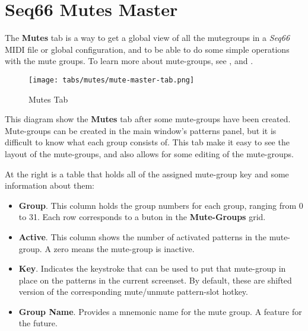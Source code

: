 %
%
%

\section{Seq66 Mutes Master}
\label{sec:mutes_master}

   The \textbf{Mutes} tab is a way to get a global view of all the mutegroups in
   a \textsl{Seq66} MIDI file or global configuration, and to be able to do
   some simple operations with the mute groups.
   To learn more about mute-groups, see
   , and
   .

\begin{figure}[H]
   \centering 
   \texttt{[image: tabs/mutes/mute-master-tab.png]}
   \caption{Mutes Tab}
   \label{fig:mutes_master_tab}
\end{figure}

   This diagram show the \textbf{Mutes} tab after some mute-groups have been
   created.  Mute-groups can be created in the main window's patterns panel,
   but it is difficult to know what each group consists of.  This tab make it
   easy to see the layout of the mute-groups, and also allows for some editing
   of the mute-groups.

   \setcounter{ItemCounter}{0}      %

   At the right is a table that holds all of the assigned mute-group key and
   some information about them:

      \begin{itemize}
         \item \textbf{Group}.
            This column holds the group numbers for each group, ranging from 0
            to 31.  Each row corresponds to a buton in the \textbf{Mute-Groups}
            grid.
         \item \textbf{Active}.
            This column shows the number of activated patterns in the
            mute-group.  A zero means the mute-group is inactive.
         \item \textbf{Key}.
            Indicates the keystroke that can be used to put that mute-group in
            place on the patterns in the current screenset.
            By default, these are shifted version of the corresponding
            mute/unmute pattern-slot hotkey.
         \item \textbf{Group Name}.
            Provides a mnemonic name for the mute group.  A feature for the
            future.
      \end{itemize}

